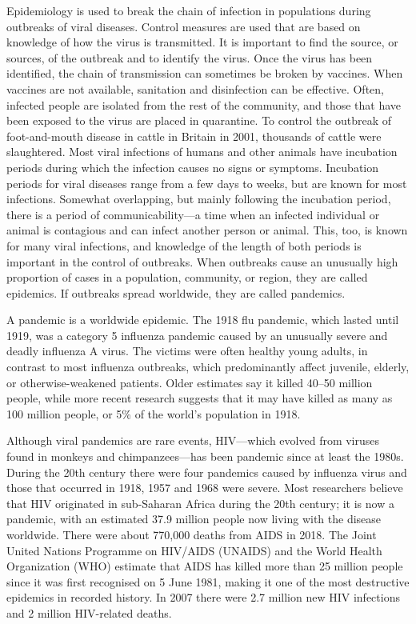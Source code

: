 Epidemiology is used to break the chain of infection in populations during outbreaks of viral diseases. Control measures are used that are based on knowledge of how the virus is transmitted. It is important to find the source, or sources, of the outbreak and to identify the virus. Once the virus has been identified, the chain of transmission can sometimes be broken by vaccines. When vaccines are not available, sanitation and disinfection can be effective. Often, infected people are isolated from the rest of the community, and those that have been exposed to the virus are placed in quarantine. To control the outbreak of foot-and-mouth disease in cattle in Britain in 2001, thousands of cattle were slaughtered. Most viral infections of humans and other animals have incubation periods during which the infection causes no signs or symptoms. Incubation periods for viral diseases range from a few days to weeks, but are known for most infections. Somewhat overlapping, but mainly following the incubation period, there is a period of communicability---a time when an infected individual or animal is contagious and can infect another person or animal. This, too, is known for many viral infections, and knowledge of the length of both periods is important in the control of outbreaks. When outbreaks cause an unusually high proportion of cases in a population, community, or region, they are called epidemics. If outbreaks spread worldwide, they are called pandemics.

A pandemic is a worldwide epidemic. The 1918 flu pandemic, which lasted until 1919, was a category 5 influenza pandemic caused by an unusually severe and deadly influenza A virus. The victims were often healthy young adults, in contrast to most influenza outbreaks, which predominantly affect juvenile, elderly, or otherwise-weakened patients. Older estimates say it killed 40--50 million people, while more recent research suggests that it may have killed as many as 100 million people, or 5\% of the world's population in 1918.

Although viral pandemics are rare events, HIV---which evolved from viruses found in monkeys and chimpanzees---has been pandemic since at least the 1980s. During the 20th century there were four pandemics caused by influenza virus and those that occurred in 1918, 1957 and 1968 were severe. Most researchers believe that HIV originated in sub-Saharan Africa during the 20th century; it is now a pandemic, with an estimated 37.9 million people now living with the disease worldwide. There were about 770,000 deaths from AIDS in 2018. The Joint United Nations Programme on HIV/AIDS (UNAIDS) and the World Health Organization (WHO) estimate that AIDS has killed more than 25 million people since it was first recognised on 5 June 1981, making it one of the most destructive epidemics in recorded history. In 2007 there were 2.7 million new HIV infections and 2 million HIV-related deaths.

